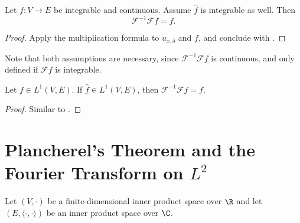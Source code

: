 \begin{theorem}
  \label{thm:fourier-inversion}
  Let $f:V\to E$ be integrable and continuous. Assume $\widehat f$ is integrable as well. Then
  $$\mathcal F^{-1}\mathcal F f=f.$$
  \leanok
\end{theorem}
\begin{proof}
  \leanok
  Apply the multiplication formula  to $u_{x,\delta}$ and $f$, and conclude with
  .
\end{proof}

\begin{remark}
  Note that both assumptions are necessary, since $\mathcal F^{-1}\mathcal Ff$ is continuous, and
  only defined if $\mathcal Ff$ is integrable.
\end{remark}

\begin{theorem}
  \label{thm:fourier-inversion-L1}
  Let $f\in L^1(V,E)$. If $\widehat f\in L^1(V,E)$, then $\mathcal F^{-1}\mathcal Ff=f$.
\end{theorem}
\begin{proof}
  Similar to .
\end{proof}

\section{\texorpdfstring{Plancherel's Theorem and the Fourier Transform on $L^2$}
                        {Plancherel's Theorem and the Fourier Transform on L2}}
Let $(V,\cdot)$ be a finite-dimensional inner product space over $\R$ and let $(E,\langle\cdot,\cdot\rangle)$ be an inner product space over $\C$.

